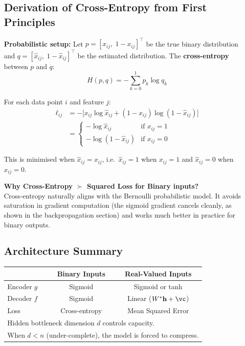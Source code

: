 \documentclass[12pt,a4paper]{article}
\newcommand{\vh}{\mathbf{h}}
\begin{document}
\subsection{Derivation of Cross-Entropy from First Principles}

\textbf{Probabilistic setup:}
Let $p = [x_{ij},\; 1-x_{ij}]^\top$ be the true binary distribution and $q = [\hat{x}_{ij},\; 1-\hat{x}_{ij}]^\top$ be the estimated distribution. The \textbf{cross-entropy} between $p$ and $q$:
\[
H(p,q) = -\sum_{k=0}^{1} p_k \log q_k
\]

For each data point $i$ and feature $j$:
\begin{align*}
\ell_{ij}
&= -\bigl[x_{ij}\log\hat{x}_{ij} + (1-x_{ij})\log(1-\hat{x}_{ij})\bigr]\\
&= \begin{cases}
    -\log\hat{x}_{ij} & \text{if } x_{ij}=1\\
    -\log(1-\hat{x}_{ij}) & \text{if } x_{ij}=0
   \end{cases}
\end{align*}

This is minimised when $\hat{x}_{ij} = x_{ij}$, i.e.\ $\hat{x}_{ij}=1$ when $x_{ij}=1$ and $\hat{x}_{ij}=0$ when $x_{ij}=0$.

\begin{keybox}
\textbf{Why Cross-Entropy $\succ$ Squared Loss for Binary inputs?}\\
Cross-entropy naturally aligns with the Bernoulli probabilistic model. It avoids saturation in gradient computation (the sigmoid gradient cancels cleanly, as shown in the backpropagation section) and works much better in practice for binary outputs.
\end{keybox}

\subsection{Architecture Summary}

\begin{center}
\begin{tabular}{lcc}
\toprule
 & \textbf{Binary Inputs} & \textbf{Real-Valued Inputs} \\
\midrule
Encoder $g$ & Sigmoid & Sigmoid or tanh \\
Decoder $f$ & Sigmoid & Linear ($W^*\vh + \vc$) \\
Loss & Cross-entropy & Mean Squared Error \\
\midrule
\multicolumn{3}{l}{Hidden bottleneck dimension $d$ controls capacity.} \\
\multicolumn{3}{l}{When $d < n$ (under-complete), the model is forced to compress.} \\
\bottomrule
\end{tabular}
\end{center}
\end{document}
